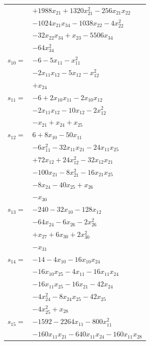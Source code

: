 \begin{longtable}{@{}r@{\;}l@{}}
 & \(\displaystyle +1988x_{21} +1320x_{21}^{2} -256x_{21}x_{22}\) \\
 & \(\displaystyle -1024x_{21}x_{34} -1038x_{22} -4x_{22}^{2}\) \\
 & \(\displaystyle -32x_{22}x_{34} +x_{23} -5506x_{34}\) \\
 & \(\displaystyle -64x_{34}^{2}\) \\[3pt]
\(s_{10}=\) & \(\displaystyle -6 -5x_{11} -x_{11}^{2}\) \\
 & \(\displaystyle -2x_{11}x_{12} -5x_{12} -x_{12}^{2}\) \\
 & \(\displaystyle +x_{24}\) \\[3pt]
\(s_{11}=\) & \(\displaystyle -6 +2x_{10}x_{11} -2x_{10}x_{12}\) \\
 & \(\displaystyle -2x_{11}x_{12} -10x_{12} -2x_{12}^{2}\) \\
 & \(\displaystyle -x_{21} +x_{24} +x_{25}\) \\[3pt]
\(s_{12}=\) & \(\displaystyle 6 +8x_{10} -50x_{11}\) \\
 & \(\displaystyle -6x_{11}^{2} -32x_{11}x_{21} -24x_{11}x_{25}\) \\
 & \(\displaystyle +72x_{12} +24x_{12}^{2} -32x_{12}x_{21}\) \\
 & \(\displaystyle -100x_{21} -8x_{21}^{2} -16x_{21}x_{25}\) \\
 & \(\displaystyle -8x_{24} -40x_{25} +x_{26}\) \\
 & \(\displaystyle -x_{30}\) \\[3pt]
\(s_{13}=\) & \(\displaystyle -240 -32x_{10} -128x_{12}\) \\
 & \(\displaystyle -64x_{24} -6x_{26} -2x_{26}^{2}\) \\
 & \(\displaystyle +x_{27} +6x_{30} +2x_{30}^{2}\) \\
 & \(\displaystyle -x_{31}\) \\[3pt]
\(s_{14}=\) & \(\displaystyle -14 -4x_{10} -16x_{10}x_{24}\) \\
 & \(\displaystyle -16x_{10}x_{25} -4x_{11} -16x_{11}x_{24}\) \\
 & \(\displaystyle -16x_{11}x_{25} -16x_{21} -42x_{24}\) \\
 & \(\displaystyle -4x_{24}^{2} -8x_{24}x_{25} -42x_{25}\) \\
 & \(\displaystyle -4x_{25}^{2} +x_{28}\) \\[3pt]
\(s_{15}=\) & \(\displaystyle -1592 -2264x_{11} -800x_{11}^{2}\) \\
 & \(\displaystyle -160x_{11}x_{21} -640x_{11}x_{24} -160x_{11}x_{28}\) \\

\end{longtable}
